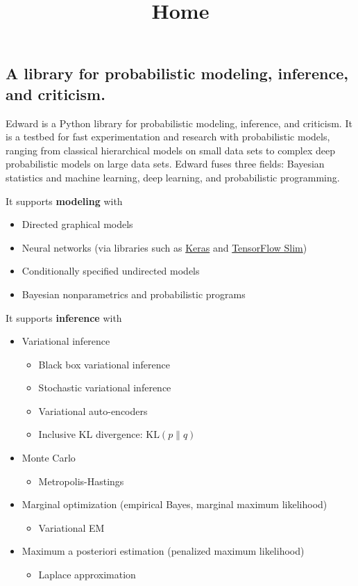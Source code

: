 \title{Home}

\subsection{A library for probabilistic modeling, inference, and criticism.}

Edward is a Python library for probabilistic modeling, inference, and
criticism. It is a testbed for fast experimentation and research with
probabilistic models, ranging from classical hierarchical models on
small data sets to complex deep probabilistic models on large data
sets. Edward fuses three fields: Bayesian statistics and machine
learning, deep learning, and probabilistic programming.


It supports \textbf{modeling} with
\begin{itemize}
\item Directed graphical models
\item Neural networks (via libraries such as
  \href{http://keras.io}{Keras} and
  \href{https://github.com/tensorflow/tensorflow/tree/master/tensorflow/contrib/slim}{TensorFlow
  Slim})
\item Conditionally specified undirected models
\item Bayesian nonparametrics and probabilistic programs
\end{itemize}

It supports \textbf{inference} with
\begin{itemize}
\item Variational inference
  \begin{itemize}
    \item Black box variational inference
    \item Stochastic variational inference
    \item Variational auto-encoders
    \item Inclusive KL divergence: $\text{KL}(p\|q)$
  \end{itemize}
\item Monte Carlo
  \begin{itemize}
    \item Metropolis-Hastings
  \end{itemize}
\item Marginal optimization (empirical Bayes, marginal maximum likelihood)
  \begin{itemize}
    \item Variational EM
  \end{itemize}
\item Maximum a posteriori estimation (penalized maximum likelihood)
  \begin{itemize}
  \item Laplace approximation
  \end{itemize}
\end{itemize}

